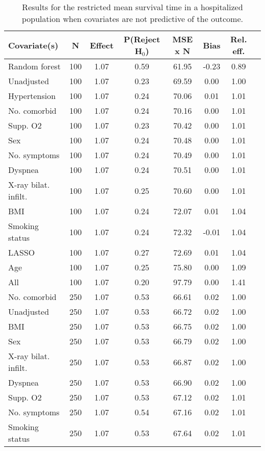 \documentclass{article}
\begin{document}
{\tabcolsep=6pt  %
\begin{longtable}{lccccccc}
\caption{Results for the restricted mean survival time in a hospitalized population when covariates are not predictive of the outcome.} \\
Covariate(s) & N & Effect & P(Reject H$_0$) & MSE x N & Bias & Rel. eff.\\ \midrule
Random forest & 100 & 1.07 & 0.59 & 61.95 & -0.23 & 0.89 \\ 
Unadjusted & 100 & 1.07 & 0.23 & 69.59 &  0.00 & 1.00 \\ 
Hypertension & 100 & 1.07 & 0.24 & 70.06 &  0.01 & 1.01 \\ 
No. comorbid & 100 & 1.07 & 0.24 & 70.16 &  0.00 & 1.01 \\ 
Supp. O2 & 100 & 1.07 & 0.23 & 70.42 &  0.00 & 1.01 \\ 
Sex & 100 & 1.07 & 0.24 & 70.48 &  0.00 & 1.01 \\ 
No. symptoms & 100 & 1.07 & 0.24 & 70.49 &  0.00 & 1.01 \\ 
Dyspnea & 100 & 1.07 & 0.24 & 70.51 &  0.00 & 1.01 \\ 
X-ray bilat. infilt. & 100 & 1.07 & 0.25 & 70.60 &  0.00 & 1.01 \\ 
BMI & 100 & 1.07 & 0.24 & 72.07 &  0.01 & 1.04 \\ 
Smoking status & 100 & 1.07 & 0.24 & 72.32 & -0.01 & 1.04 \\ 
LASSO & 100 & 1.07 & 0.27 & 72.69 &  0.01 & 1.04 \\ 
Age & 100 & 1.07 & 0.25 & 75.80 &  0.00 & 1.09 \\ 
All & 100 & 1.07 & 0.20 & 97.79 &  0.00 & 1.41 \\ \midrule() 
No. comorbid & 250 & 1.07 & 0.53 & 66.61 &  0.02 & 1.00 \\ 
Unadjusted & 250 & 1.07 & 0.53 & 66.72 &  0.02 & 1.00 \\ 
BMI & 250 & 1.07 & 0.53 & 66.75 &  0.02 & 1.00 \\ 
Sex & 250 & 1.07 & 0.53 & 66.79 &  0.02 & 1.00 \\ 
X-ray bilat. infilt. & 250 & 1.07 & 0.53 & 66.87 &  0.02 & 1.00 \\ 
Dyspnea & 250 & 1.07 & 0.53 & 66.90 &  0.02 & 1.00 \\ 
Supp. O2 & 250 & 1.07 & 0.53 & 67.12 &  0.02 & 1.01 \\ 
No. symptoms & 250 & 1.07 & 0.54 & 67.16 &  0.02 & 1.01 \\ 
Smoking status & 250 & 1.07 & 0.53 & 67.64 &  0.02 & 1.01 \\ 

\end{longtable}}
\end{document}
